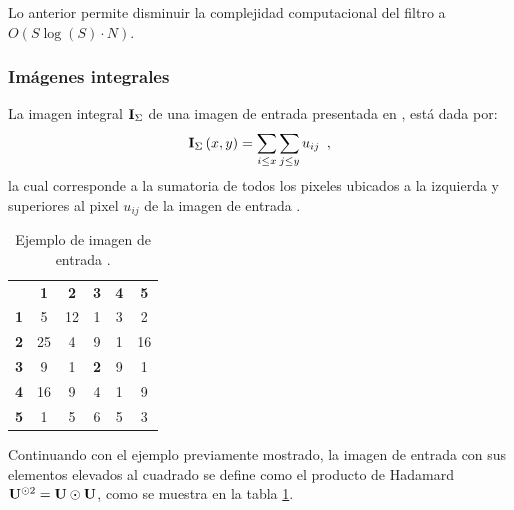 {Lo anterior permite disminuir la complejidad computacional del filtro a $O(S\log(S) \cdot N)$.
 
\subsubsection{Im\'agenes integrales}


La imagen integral $\mathbf{I}_{\Sigma}$ de una imagen de entrada  presentada en \cite{viola2001robust}, est\'a dada por: 
\begin{equation}
\mathbf{I}_{\Sigma}\left(x,y\right)=\sum_{i\leq x}\sum_{j\leq y}u_{ij} \enspace ,
\end{equation}
la cual corresponde a la sumatoria de todos los  pixeles ubicados a la izquierda y superiores al pixel $u_{ij}$ de la imagen de entrada .

\begin{table}
\begin{center}
\caption{Ejemplo de imagen de entrada .\label{table:imageExample2}}

\renewcommand{\arraystretch}{1.4}
\setlength\tabcolsep{3pt}

{
\begin{tabular}{cc|ccc|c}
 & \multicolumn{1}{c}{\textbf{1}} & \textbf{2} & \textbf{3} & \multicolumn{1}{c}{\textbf{4}} & \textbf{5}\tabularnewline
\textbf{1} & \multicolumn{1}{c}{5} & 12 & 1 & \multicolumn{1}{c}{3} & 2\tabularnewline
\cline{3-5} 
\textbf{2} & 25 & 4 & 9 & 1 & 16\tabularnewline
\textbf{3} & 9 & 1 & \textbf{2} & 9 & 1\tabularnewline
\textbf{4} & 16 & 9 & 4 & 1 & 9\tabularnewline
\cline{3-5} 
\textbf{5} & \multicolumn{1}{c}{1} & 5 & 6 & \multicolumn{1}{c}{5} & 3\tabularnewline
\end{tabular}
}
\par\end{center} 
\end{table}


Continuando con el ejemplo previamente mostrado, la imagen de entrada  con sus elementos elevados al cuadrado se define como el producto de Hadamard $\mathbf{U}^{\odot 2} = \mathbf{U} \odot \mathbf{U}$, como se muestra en la tabla \ref{table:imageExample2}. 


}
